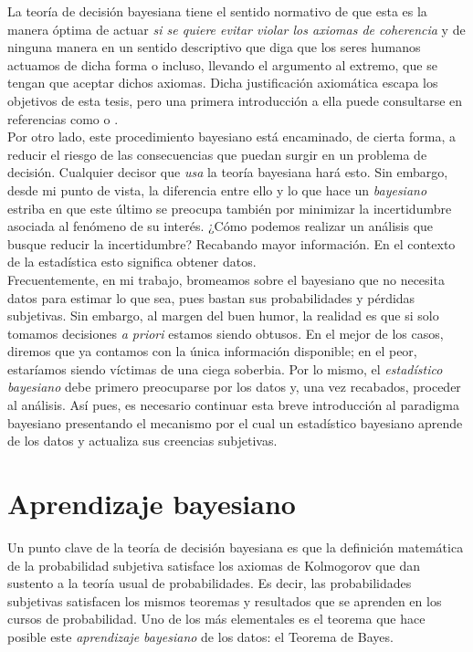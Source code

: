 La teoría de decisión bayesiana tiene el sentido normativo de que esta es la manera óptima de actuar \textit{si se quiere evitar violar los axiomas de coherencia} y de ninguna manera en un sentido descriptivo que diga que los seres humanos actuamos de dicha forma o incluso, llevando el argumento al extremo, que se tengan que aceptar dichos axiomas. Dicha justificación axiomática escapa los objetivos de esta tesis, pero una primera introducción a ella puede consultarse en referencias como \textcite{Mendoza11} o \textcite{Bernardo81}.\\

Por otro lado, este procedimiento bayesiano está encaminado, de cierta forma, a reducir el riesgo de las consecuencias que puedan surgir en un problema de decisión. Cualquier decisor que \textit{usa} la teoría bayesiana hará esto. Sin embargo, desde mi punto de vista, la diferencia entre ello y lo que hace un \textit{bayesiano} estriba en que este último se preocupa también por minimizar la incertidumbre asociada al fenómeno de su interés. ¿Cómo podemos realizar un análisis que busque reducir la incertidumbre? Recabando mayor información. En el contexto de la estadística esto significa obtener datos.\\ 

Frecuentemente, en mi trabajo, bromeamos sobre el bayesiano que no necesita datos para estimar lo que sea, pues bastan sus probabilidades y pérdidas subjetivas. Sin embargo, al margen del buen humor, la realidad es que si solo tomamos decisiones \textit{a priori} estamos siendo obtusos. En el mejor de los casos, diremos que ya contamos con la única información disponible; en el peor, estaríamos siendo víctimas de una ciega soberbia. Por lo mismo, el \textit{estadístico bayesiano} debe primero preocuparse por los datos y, una vez recabados, proceder al análisis. Así pues, es necesario continuar esta breve introducción al paradigma bayesiano presentando el mecanismo por el cual un estadístico bayesiano aprende de los datos y actualiza sus creencias subjetivas.
	
\section{Aprendizaje bayesiano}

Un punto clave de la teoría de decisión bayesiana es que la definición matemática de la probabilidad subjetiva satisface los axiomas de Kolmogorov que dan sustento a la teoría usual de probabilidades. Es decir, las probabilidades subjetivas satisfacen los mismos teoremas y resultados que se aprenden en los cursos de probabilidad. Uno de los más elementales es el teorema que hace posible este \textit{aprendizaje bayesiano} de los datos: el Teorema de Bayes.

